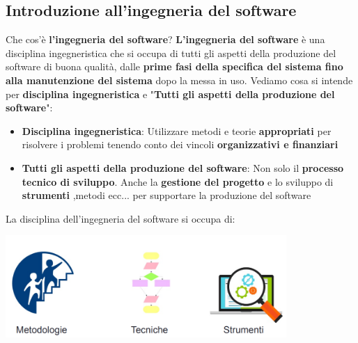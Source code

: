 \documentclass[12pt]{article}
\begin{document}
\subsection{Introduzione all'ingegneria del software}
Che cos'è \textbf{l'ingegneria del software}? \textbf{L'ingegneria del software} è una disciplina ingegneristica che si occupa
di tutti gli aspetti della produzione del software di buona qualità, dalle \textbf{prime fasi della specifica del sistema fino alla manutenzione del sistema}
dopo la messa in uso. Vediamo cosa si intende per \textbf{disciplina ingegneristica} e "\textbf{Tutti gli aspetti della produzione del software}":
\begin{itemize}
    \item \textbf{Disciplina ingegneristica}: Utilizzare metodi e teorie \textbf{appropriati} per risolvere i problemi tenendo conto dei vincoli \textbf{organizzativi e finanziari}
    \item \textbf{Tutti gli aspetti della produzione del software}: Non solo il \textbf{processo tecnico di sviluppo}. Anche la \textbf{gestione del progetto} e lo sviluppo di \textbf{strumenti}
    ,metodi ecc... per supportare la produzione del software
\end{itemize}
\newpage
\noindent
La disciplina dell'ingegneria del software si occupa di:
\begin{center}
    \includegraphics[width = 0.80\textwidth]{Images/2.png}
\end{center}
\end{document}
